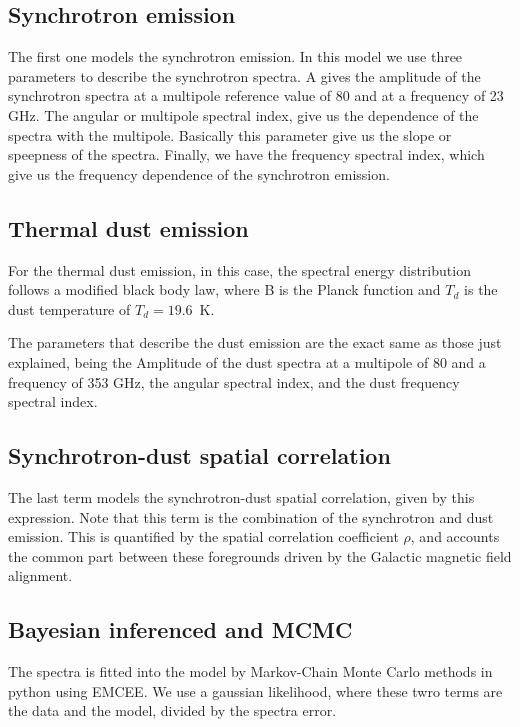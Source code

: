 \documentclass[12pt,a4paper]{article}
\begin{document}
\subsection{Synchrotron emission}

The first one models the synchrotron emission. In this model we use three parameters to describe the synchrotron spectra. A gives the amplitude of the synchrotron spectra at a multipole reference value of 80 and at a frequency of 23 GHz. The angular or multipole spectral index, give us the dependence of the spectra with the multipole. Basically this parameter give us the slope or speepness of the spectra. Finally, we have the frequency spectral index, which give us the frequency dependence of the synchrotron emission.

\subsection{Thermal dust emission}

For the thermal dust emission, in this case, the spectral energy distribution follows a modified black body law, where B is the Planck function and $T_d$ is the dust temperature of $T_d = 19.6$~K.

The parameters that describe the dust emission are the exact same as those just explained, being the Amplitude of the dust spectra at a multipole of 80 and a frequency of 353 GHz, the angular spectral index, and the dust frequency spectral index.

\subsection{Synchrotron-dust spatial correlation}

The last term models the synchrotron-dust spatial correlation, given by this expression. Note that this term is the combination of the synchrotron and dust emission. This is quantified by the spatial correlation coefficient $\rho$, and accounts the common part between these foregrounds driven by the Galactic magnetic field alignment.

\subsection{Bayesian inferenced and MCMC}

The spectra is fitted into the model by Markov-Chain Monte Carlo methods in python using EMCEE. We use a gaussian likelihood, where these twro terms are the data and the model, divided by the spectra error. 
\end{document}
